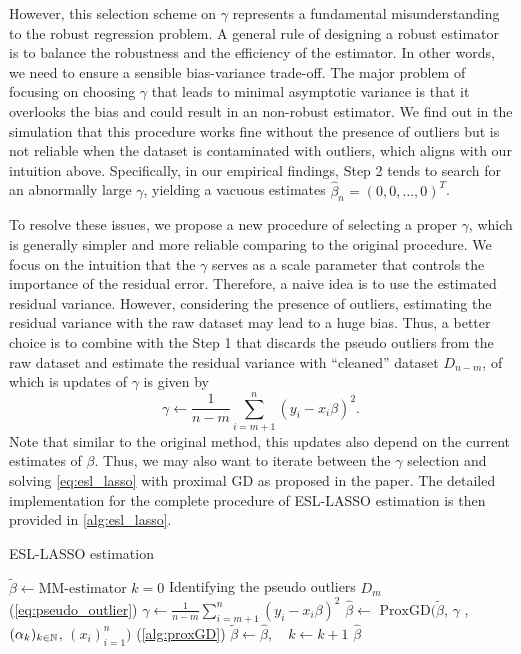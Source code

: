 However, this selection scheme on $\gamma$ represents a fundamental misunderstanding to the robust regression problem. A general rule of designing a robust estimator is to balance the robustness and
the efficiency of the estimator. In other words, we need to ensure a sensible bias-variance trade-off. The major
problem of focusing on choosing $\gamma$ that leads to minimal asymptotic variance is that it overlooks the bias and
could result in an non-robust estimator. We find out in the simulation that this procedure works fine without the
presence of outliers but is not reliable when the dataset is contaminated with outliers, which aligns with our
intuition above.
Specifically, in our empirical findings, Step 2 tends to search for an abnormally large $\gamma$, yielding a vacuous estimates $\hat \beta_n = (0,0, \dots ,0)^T $. 
 
To resolve these issues, we propose a new procedure of selecting a proper $\gamma$, which is generally simpler and more reliable comparing to the original procedure.   
We focus on the intuition that the $\gamma$ serves as a scale parameter that controls the importance of the residual error.
Therefore, a naive idea is to use the estimated residual variance. However, considering the presence of outliers, estimating the residual variance with the raw dataset may lead to a huge bias. Thus, a better choice is to combine with the Step 1 that discards the pseudo outliers from  the raw dataset and estimate the residual variance with ``cleaned'' dataset $D_{n - m}$, of which is updates of $\gamma$ is given by 
\[
    \gamma \gets \frac{1}{n-m} \sum_{i = m+1}^n ( y_i - x_i \beta )^2.
\]
Note that similar to the original method, this updates also depend on the current estimates of $\beta$. Thus, we may also want to iterate between the $\gamma$ selection and solving \cref{eq:esl_lasso} with proximal GD as proposed in the paper. The detailed implementation for the complete procedure of  ESL-LASSO estimation is then provided in \cref{alg:esl_lasso}. 

\begin{algorithm}[t!] 
    \caption{ESL-LASSO estimation} \label{alg:esl_lasso} 
\begin{algorithmic}
   \State $\tilde \beta \gets \text{MM-estimator}$
   \State $ k = 0$
\State Identifying the pseudo outliers $D_m$ (\cref{eq:pseudo_outlier})
\State $\gamma \gets \frac{1}{n-m} \sum_{i = m+1}^n ( y_i - x_i \beta )^2$
\State $\hat \beta \gets \text{ ProxGD}(\tilde \beta$, $\gamma$ ,$(\alpha_k)_{k\in\mathbb{N}}$, $(x_i)_{i=1}^n) $ (\cref{alg:proxGD})
\State $\tilde{ \beta }\gets \hat \beta, \quad k \gets k+1$ 
\EndFor
    \State \Return $\hat \beta$ 
   \EndProcedure 
\end{algorithmic}
\end{algorithm}




